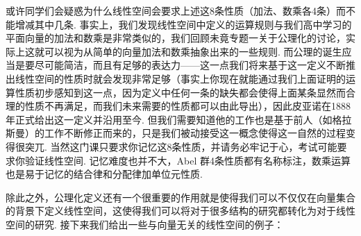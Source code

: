或许同学们会疑惑为什么线性空间会要求上述这8条性质（加法、数乘各4条）而不能增减其中几条. 事实上，我们发现线性空间中定义的运算规则与我们高中学习的平面向量的加法和数乘是非常类似的，我们回顾未竟专题一关于公理化的讨论，实际上这就可以视为从简单的向量加法和数乘抽象出来的一些规则. 而公理的诞生应当是要尽可能简洁，而且有足够的表达力——这一点我们将来基于这一定义不断推出线性空间的性质时就会发现非常足够（事实上你现在就能通过我们上面证明的运算性质初步感知到这一点，因为定义中任何一条的缺失都会使得上面某条显然而合理的性质不再满足，而我们未来需要的性质都可以由此导出），因此皮亚诺在1888年正式给出这一定义并沿用至今. 但我们需要知道他的工作也是基于前人（如格拉斯曼）的工作不断修正而来的，只是我们被动接受这一概念使得这一自然的过程变得很突兀. 当然这门课只要求你记忆这8条性质，并请务必牢记于心，考试可能要求你验证线性空间. 记忆难度也并不大，Abel 群4条性质都有名称标注，数乘运算也是易于记忆的结合律和分配律加单位元性质.

除此之外，公理化定义还有一个很重要的作用就是使得我们可以不仅仅在向量集合的背景下定义线性空间，这使得我们可以将对于很多结构的研究都转化为对于线性空间的研究. 接下来我们给出一些与向量无关的线性空间的例子：

